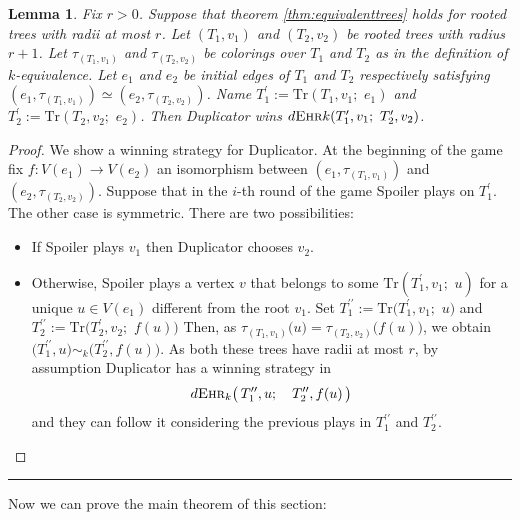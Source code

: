 \documentclass[12pt,notitlepage,a4paper]{article}
\newtheorem{lemma}{Lemma}[section]
\theoremstyle{definition}
\newcommand{\ehr}{\textsc{Ehr}}
\begin{document}
\begin{lemma} \label{lem:equivalentedges}
	Fix $r>0$. Suppose that theorem \ref{thm:equivalenttrees}
	holds for rooted trees with radii at most $r$.
	Let $(T_1,v_1)$ and $(T_2,v_2)$ be rooted trees with radius
	$r+1$. Let $\tau_{(T_1,v_1)}$ and $\tau_{(T_2,v_2)}$
	be colorings over $T_1$ and $T_2$ as in the
	definition of $k$-equivalence. 
	Let $e_1$ and $e_2$ be initial edges 
	of $T_1$ and $T_2$ respectively satisfying 
	$(e_1,\tau_{(T_1,v_1)})\simeq (e_2,\tau_{(T_2,v_2)})$. Name 
	$T^\prime_1:=\mathrm{Tr}(T_1,v_1; \,\,e_1)$ and 
	$T^\prime_2:=\mathrm{Tr}(T_2,v_2;\,\,e_2)$. Then
	Duplicator wins 
	$d\ehr{k}(T^\prime_1, v_1; \, \, T^\prime_2,v_2)$.
\end{lemma}
\begin{proof}
	We show a winning strategy for Duplicator.
	At the beginning of the game fix 
	$f:V(e_1)\rightarrow V(e_2)$ an isomorphism between 
	$(e_1,\tau_{(T_1,v_1)})$
	and $(e_2,\tau_{(T_2,v_2)})$.
	Suppose that in the $i$-th round of the game Spoiler
	plays on $T^\prime_1$. The other case is symmetric. 
	There are two possibilities:
	\begin{itemize}
		\item If Spoiler plays $v_1$ 
		then Duplicator chooses $v_2$. 
		\item Otherwise, Spoiler plays a vertex $v$ that belongs
		to some $\mathrm{Tr}(T^\prime_1,v_1;\,\, u)$ for a unique $u\in V(e_1)$
		different from the root $v_1$. 
		Set $T^{\prime\prime}_1:=
		\mathrm{Tr}\big(T^\prime_1,v_1;\,\, u\big)$
		and
		$T^{\prime\prime}_2:=\mathrm{Tr}\big(T^\prime_2,v_2;\,\, f(u)\big)$
		Then, as $\tau_{(T_1,v_1)}\big(u\big)=\tau_{(T_2,v_2)}\big(f(u)\big)$,
		we obtain
		$\big(T^{\prime\prime}_1,u\big) \sim_k 
		\big(T^{\prime \prime}_2,f(u)\big)$.
		As both these trees have radii at most $r$, 
		by assumption Duplicator has a winning 
		strategy in \[
		d\ehr_{k}\big(\,T^{\prime\prime}_1, u;
		\quad T^{\prime \prime}_2, f(u)\,  \big)
		\]
		and they can follow it considering the previous plays in
		$T^{\prime\prime}_1$ and $T^{\prime\prime}_2$.	
	\end{itemize}
\end{proof}
\noindent\rule{2cm}{0.4pt}

Now we can prove the main theorem of this section:
\end{document}
